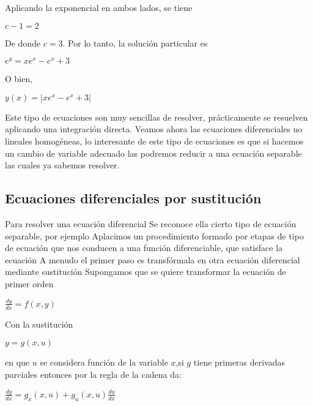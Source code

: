 \documentclass[l etterpaper,11pt]{article}
\begin{document}
Aplicando la exponencial en ambos lados, se tiene
\begin {center}
$c-1=2$\\
\end {center}

De donde $c=3$. Por lo tanto, la solución particular es
\begin {center}
$e^y=xe^x-e^x+3$\\
\end {center}

O bien,
\begin {center}
$y(x)=\left|xe^x-e^x+3\right|$\\
\end {center}

Este tipo de ecuaciones son muy sencillas de resolver, prácticamente se resuelven aplicando una integración directa.
Veamos ahora las ecuaciones diferenciales no lineales homogéneas, lo interesante de este tipo de ecuaciones es que si hacemos un cambio de variable adecuado las podremos reducir a una ecuación separable las cuales ya sabemos resolver.



\subsection{Ecuaciones diferenciales por sustitución}

Para resolver una ecuación diferencial 
Se reconoce ella cierto tipo de ecuación separable, por ejemplo 
Aplacimos un procedimiento formado por etapas de tipo de ecuación que nos conducen a una función diferenciable, que satisface la ecuación 
A menudo el primer paso es transfórmala en otra ecuación diferencial mediante sustitución 
Supongamos que se quiere transformar la ecuación de primer orden 
\begin{center}
$\frac{dy}{dx}=f(x,y)$\\
\end{center}

Con la sustitución 
\begin{center}

$y=g(x,u)$\\
\end{center}

en que $ u$ se considera función de la variable $x$,si $g$ tiene primeras derivadas parciales entonces por la regla de la cadena da:
\begin{center}

$\frac{dy}{dx}=g_x(x,u)+g_u(x,u)\frac{du}{dx}$\\
\end{center}
\end{document}
